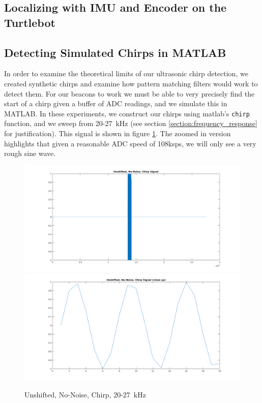 \documentclass{article}
\begin{document}

  \subsection{Localizing with IMU and Encoder on the Turtlebot}


  \subsection{Detecting Simulated Chirps in MATLAB}

    In order to examine the theoretical limits of our ultrasonic chirp detection, we created synthetic chirps and examine how pattern matching filters would work to detect them. For our beacons to work we must be able to very precisely find the start of a chirp given a buffer of ADC readings, and we simulate this in MATLAB. In these experiments, we construct our chirps using matlab's \texttt{chirp} function, and we sweep from 20-27\SI{}{\kilo\hertz} (see section \ref{section:frequency_response} for justification). This signal is shown in figure \ref{fig:unshifted_no_noise_chirp}. The zoomed in version highlights that given a reasonable ADC speed of 108ksps, we will only see a very rough sine wave.

    \begin{figure}[H]
      \centering
      \includegraphics[width=1\linewidth]{./images/unshifted_no_noise_chirp.png}
      \includegraphics[width=1\linewidth]{./images/unshifted_no_noise_chirp_zoomed.png}
      \caption{Unshifted, No-Noise, Chirp, 20-27\SI{}{\kilo\hertz}}
      \label{fig:unshifted_no_noise_chirp}
    \end{figure}
\end{document}
